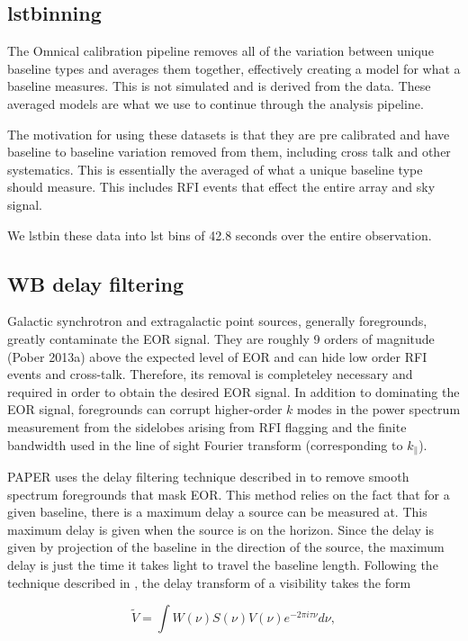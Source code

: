 \documentclass[twocolumn,numberedappendix]{emulateapj}
\begin{document}
\subsection{lstbinning}
The Omnical calibration pipeline removes all of the variation between unique
baseline types and averages them together, effectively creating a model for what
a baseline measures. This is not simulated and is derived from the data. These
averaged models are what we use to continue through the analysis pipeline. 

The motivation for using these datasets is that they are pre calibrated and have
baseline to baseline variation removed from them, including cross talk and other
systematics. This is essentially the averaged of what a unique baseline type
should measure. This includes RFI events that effect the entire array and sky
signal. 

We lstbin these data into lst bins of 42.8 seconds over the entire observation.

\subsection{WB delay filtering}
Galactic synchrotron and extragalactic point sources, generally foregrounds,
greatly contaminate the EOR signal. They are roughly 9 orders of magnitude
(Pober 2013a) above the expected level of EOR and can hide low order RFI events
and cross-talk.  Therefore, its removal is completeley necessary and required in
order to obtain the desired EOR signal. In addition to dominating the EOR
signal, foregrounds can corrupt higher-order $k$ modes in the power spectrum
measurement from the sidelobes arising from RFI flagging and the finite
bandwidth used in the line of sight Fourier transform (corresponding to
$k_{\parallel}$). 

PAPER uses the delay filtering technique described in \citep{parsons_2012b} to
remove smooth spectrum foregrounds that mask EOR. This method relies on the fact
that for a given baseline, there is a maximum delay a source can be measured at.
This maximum delay is given when the source is on the horizon. Since the 
delay is given by projection of the baseline in the direction of the source, the
maximum delay is just the time it takes light to travel the baseline length. 
Following the technique described in \citep{parsons_2012b}, the delay transform
of a visibility takes the form 

\begin{equation}\label{eqn:delay_transform}
    \tilde{V} = \int{W(\nu)S(\nu)V(\nu)e^{-2\pi{i}\tau\nu}d\nu},
\end{equation}
\end{document}
